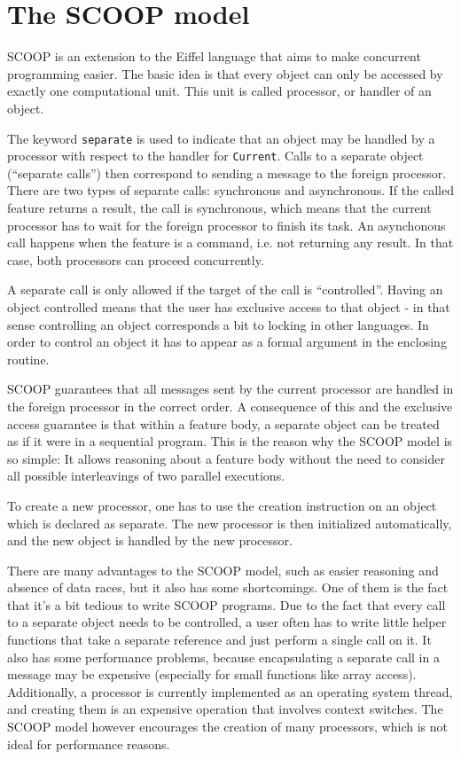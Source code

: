 \documentclass[a4paper,10pt]{article}
\begin{document}


\section {The SCOOP model}

SCOOP is an extension to the Eiffel language  that aims to make concurrent programming easier.
The basic idea is that every object can only be accessed by exactly one computational unit.
This unit is called processor, or handler of an object.

The keyword \lstinline!separate! is used to indicate that an object may be handled by a processor with respect to the handler for \lstinline!Current!.
Calls to a separate object (``separate calls'') then correspond to sending a message to the foreign processor.
There are two types of separate calls: synchronous and asynchronous.
If the called feature returns a result, the call is synchronous, which means that the current processor has to wait for the foreign processor to finish its task.
An asynchonous call happens when the feature is a command, i.e. not returning any result.
In that case, both processors can proceed concurrently.

A separate call is only allowed if the target of the call is ``controlled''.
Having an object controlled means that the user has exclusive access to that object - in that sense controlling an object corresponds a bit to locking in other languages.
In order to control an object it has to appear as a formal argument in the enclosing routine.

SCOOP guarantees that all messages sent by the current processor are handled in the foreign processor in the correct order.
A consequence of this and the exclusive access guarantee is that within a feature body, a separate object can be treated as if it were in a sequential program.
This is the reason why the SCOOP model is so simple: 
It allows reasoning about a feature body without the need to consider all possible interleavings of two parallel executions.

To create a new processor, one has to use the creation instruction on an object which is declared as separate.
The new processor is then initialized automatically, and the new object is handled by the new processor.

There are many advantages to the SCOOP model, such as easier reasoning and absence of data races, but it also has some shortcomings.
One of them is the fact that it's a bit tedious to write SCOOP programs.
Due to the fact that every call to a separate object needs to be controlled, a user often has to write little helper functions that take a separate reference and just perform a single call on it.
It also has some performance problems, because encapsulating a separate call in a message may be expensive (especially for small functions like array access).
Additionally, a processor is currently implemented as an operating system thread, and creating them is an expensive operation that involves context switches.
The SCOOP model however encourages the creation of many processors, which is not ideal for performance reasons.
\end{document}
